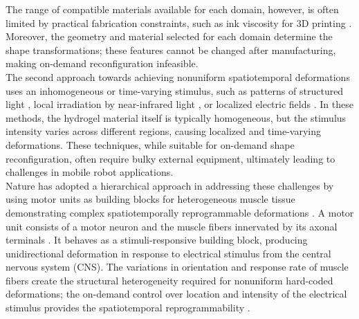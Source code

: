 The range of compatible materials available for each domain, however, is often limited by practical fabrication constraints, such as ink viscosity for 3D printing . Moreover, the geometry and material selected for each domain determine the shape transformations; these features cannot be changed after manufacturing, making on-demand reconfiguration infeasible.\\

The second approach towards achieving nonuniform spatiotemporal deformations uses an inhomogeneous or time-varying stimulus, such as patterns of structured light , local irradiation by near-infrared light , or localized electric fields . In these methods, the hydrogel material itself is typically homogeneous, but the stimulus intensity varies across different regions, causing localized and time-varying deformations. These techniques, while suitable for on-demand shape reconfiguration, often require bulky external equipment, ultimately leading to challenges in mobile robot applications.\\

Nature has adopted a hierarchical approach in addressing these challenges by using motor units as building blocks for heterogeneous muscle tissue demonstrating complex spatiotemporally reprogrammable deformations  . A motor unit consists of a motor neuron and the muscle fibers innervated by its axonal terminals .
It behaves as a stimuli-responsive building block, producing unidirectional deformation in response to electrical stimulus from the central nervous system (CNS). 
 The variations in orientation   and response rate  of muscle fibers create the structural heterogeneity  required for nonuniform hard-coded deformations; the on-demand control over location and intensity of the electrical stimulus provides the spatiotemporal reprogrammability .\\
 
